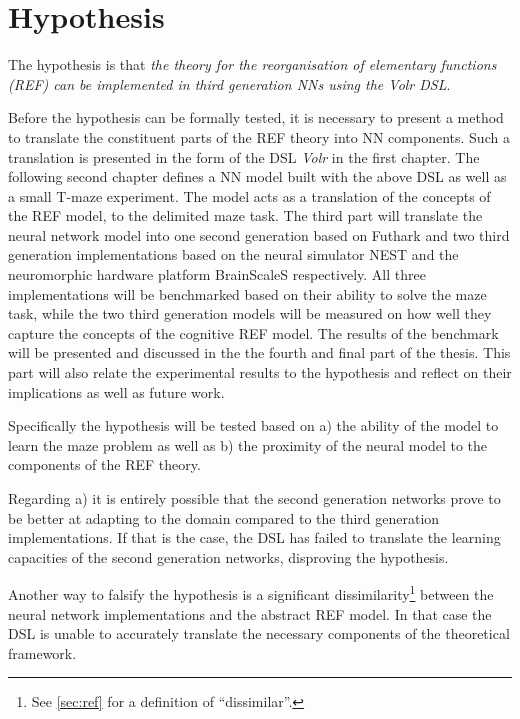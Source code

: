 \documentclass[report.tex]{subfiles}
\begin{document}
\section{Hypothesis} \label{ref:hypothesis}
The hypothesis is that 
\textit{the theory for the reorganisation of elementary functions
(\gls{REF}) can be implemented in third generation \gls{NN}s using
the Volr DSL}.

Before the hypothesis can be formally tested, it is necessary to
present a method to translate the constituent parts of the \gls{REF} theory
into \gls{NN} components.
Such a translation is presented in the form of the \gls{DSL} \textit{Volr} 
in the first chapter.
The following second chapter defines a \gls{NN}
model built with the above \gls{DSL} as well as a small T-maze experiment. 
The model acts as a translation of the concepts of the \gls{REF} model,
to the delimited maze task.
The third part will translate the neural network model 
into one second generation based on Futhark  and two third
generation implementations based on the neural simulator \gls{NEST} and 
the neuromorphic hardware platform BrainScaleS  respectively.
All three implementations will be benchmarked based on their ability 
to solve the maze task, while the two third generation models will be measured
on how well they capture the concepts of the cognitive 
\gls{REF} model.
The results of the benchmark will be presented and discussed in the the
fourth and final part of the thesis.
This part will also relate the experimental results to the
hypothesis and reflect on their implications as well as future work.

Specifically the hypothesis will be tested based on
a) the ability of the model to learn the maze problem as well as 
b) the proximity of the neural model to the components of the
\gls{REF} theory.

Regarding a) it is entirely possible that the second generation networks prove
to be better at adapting to the domain compared to the third generation
implementations.
If that is the case, the \gls{DSL} has failed to translate
the learning capacities of the second generation networks, disproving the
hypothesis.

Another way to falsify the hypothesis is a significant
dissimilarity\footnote{See \ref{sec:ref} for a definition of
\enquote{dissimilar}.} between the neural network implementations 
and the abstract \gls{REF} model. 
In that case the \gls{DSL} is unable to accurately translate the
necessary components of the theoretical framework.
\end{document}
